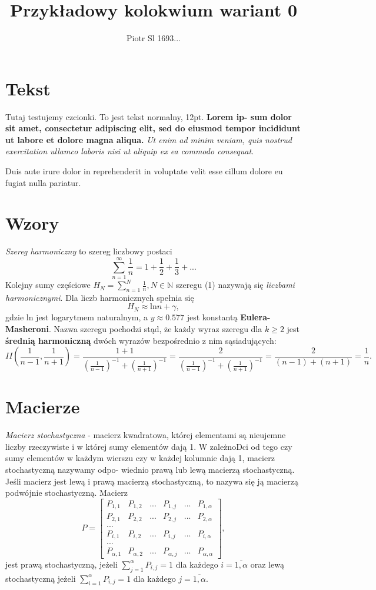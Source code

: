\documentclass[a4paper,11pt]{amsart}
\author{Piotr Sl 1693...}
\title{Przykładowy kolokwium wariant 0}
\begin{document}
\maketitle
\tableofcontents
\section{Tekst}
Tutaj testujemy czcionki. To jest tekst normalny, 12pt. \textbf{Lorem ip-
sum dolor sit amet, consectetur adipiscing elit, sed do eiusmod
tempor incididunt ut labore et dolore magna aliqua.} 
\textit{Ut enim ad
minim veniam, quis nostrud exercitation ullamco laboris nisi ut aliquip
ex ea commodo consequat.} 
\begin{Huge}Duis aute irure dolor in
reprehenderit in voluptate velit esse
cillum dolore eu fugiat nulla pariatur.
\end{Huge}
\section{Wzory}
\emph{Szereg harmoniczny} to szereg liczbowy postaci
\begin{equation}
\displaystyle\sum^\infty_{n=1}\frac{1}{n}=1+\frac{1}{2}+\frac{1}{3}+...
\end{equation}
Kolejny sumy częściowe 
$H_N=\displaystyle\sum^N_{n=1}\frac{1}{n}, N \in \mathbb{N}$ 
szeregu (1) nazywają się \emph{liczbami harmonicznymi}. 
Dla liczb harmonicznych spełnia się
$$H_N\approx \textrm{ln}  n + \gamma,$$
gdzie ln jest logarytmem naturalnym, a $y \approx 0.577$ jest konstantą
\textbf{Eulera-Masheroni}.  \newpage
Nazwa szeregu pochodzi stąd, że każdy wyraz szeregu dla $k\geq 2$ jest \textbf{średnią harmoniczną} dwóch wyrazów bezpośrednio z nim sąsiadujących:
$$II(\frac{1}{n-1},\frac{1}{n+1})=\frac{1+1}{(\frac{1}{n-1})^{-1}+(\frac{1}{n+1})^{-1}}=\frac{2}{(\frac{1}{n-1})^{-1}+(\frac{1}{n+1})^{-1}}
=\frac{2}{(n-1)+(n+1)}=\frac{1}{n}.$$
\section{Macierze}
\emph{Macierz stochastyczna} - macierz kwadratowa, której elementami 
są nieujemne liczby rzeczywiste i w której sumy elementów
dają 1. W zależnoDci od tego czy sumy elementów w każdym wierszu
czy w każdej kolumnie dają 1, macierz stochastyczną nazywamy odpo-
wiednio prawą lub lewą macierzą stochastyczną. Jeśli macierz jest lewą
i prawą macierzą stochastyczną, to nazywa się ją macierzą podwójnie
stochastyczną. Macierz
$$P=
\begin{bmatrix}
P_{1,1}&P_{1,2}&...&P_{1,j}&...&P_{1,\alpha}\\
P_{2,1}&P_{2,2}&...&P_{2,j}&...&P_{2,\alpha}\\
...\\
P_{i,1}&P_{i,2}&...&P_{i,j}&...&P_{i,\alpha}\\
...\\
P_{\alpha,1}&P_{\alpha,2}&...&P_{\alpha,j}&...&P_{\alpha,\alpha}
\end{bmatrix},$$
jest prawą stochastyczną, jeżeli $\sum^\alpha_{j=1}P_{i,j}=1$ dla każdego $i=\overline{1,\alpha}$ oraz \newline
lewą stochastyczną jeżeli $\sum^\alpha_{i=1}P_{i,j}=1$ dla każdego $j=\overline{1,\alpha}.$
\end{document}
